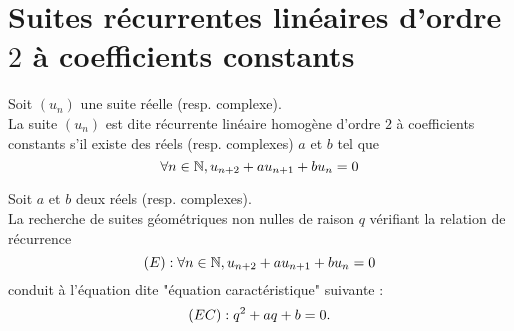 \section{Suites récurrentes linéaires d’ordre \(2\) à coefficients constants}

\begin{defi}
    Soit \((u_n)\) une suite réelle (resp. complexe).\\
    La suite \((u_n)\) est dite récurrente linéaire homogène d’ordre \(2\) à coefficients constants s’il existe des réels (resp. complexes) \(a\) et \(b\) tel que
    \[\forall n \in \mathbb{N},u_{n+2} +a u_{n+1} + b u_n = 0\]
\end{defi}

\begin{defprop}
    Soit \(a\) et \(b\) deux réels (resp. complexes). \\
    La recherche de suites géométriques non nulles de raison \(q\) vérifiant la relation de récurrence
    \[\left(E\right) : \forall n \in \mathbb{N}, u_{n+2} + a u_{n+1} + bu_n = 0\]
    conduit à l’équation dite "équation caractéristique" suivante :
   \[\left(EC\right) : q^2 + aq + b = 0.\]
\end{defprop}

